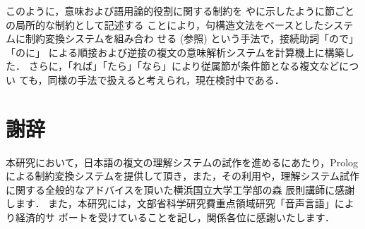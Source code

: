 このように，意味および語用論的役割に関する制約を
やに示したように節ごとの局所的な制約として記述する
ことにより，句構造文法をベースとしたシステムに制約変換システムを組み合わ
せる (参照) という手法で，接続助詞「ので」「のに」
による順接および逆接の複文の意味解析システムを計算機上に構築した．
さらに，「れば」「たら」「なら」により従属節が条件節となる複文などについ
ても，同様の手法で扱えると考えられ，現在検討中である．


\section*{謝辞}
本研究において，日本語の複文の理解システムの試作を進めるにあたり，Prolog 
による制約変換システムを提供して頂き，また，その利用や，理解システム試作
に関する全般的なアドバイスを頂いた横浜国立大学工学部の森 辰則講師に感謝
します．
また，本研究には，文部省科学研究費重点領域研究「音声言語」により経済的サ
ポートを受けていることを記し，関係各位に感謝いたします．





\newpage
\begin{biography}


\end{biography}



